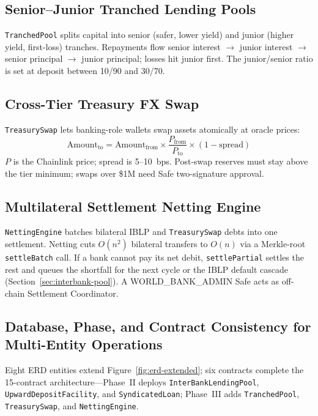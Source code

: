 \documentclass[12pt, a4paper]{report}
\begin{document}
\subsection{Senior--Junior Tranched Lending Pools}
\label{sec:tranched-pools}

\texttt{TranchedPool} splits capital into senior (safer, lower yield) and junior (higher yield, first-loss) tranches. Repayments flow senior interest $\to$ junior interest $\to$ senior principal $\to$ junior principal; losses hit junior first. The junior/senior ratio is set at deposit between 10/90 and 30/70.

\subsection{Cross-Tier Treasury FX Swap}
\label{sec:treasury-fx}

\texttt{TreasurySwap} lets banking-role wallets swap assets atomically at oracle prices:
\begin{equation}
\text{Amount}_{\text{to}} = \text{Amount}_{\text{from}} \times \frac{P_{\text{from}}}{P_{\text{to}}} \times (1 - \text{spread})
\end{equation}
\noindent $P$ is the Chainlink price; spread is 5--10~bps. Post-swap reserves must stay above the tier minimum; swaps over \$1M need Safe two-signature approval.

\subsection{Multilateral Settlement Netting Engine}
\label{sec:netting-settlement}

\texttt{NettingEngine} batches bilateral IBLP and \texttt{TreasurySwap} debts into one settlement. Netting cuts $O(n^2)$ bilateral transfers to $O(n)$ via a Merkle-root \texttt{settleBatch} call. If a bank cannot pay its net debit, \texttt{settlePartial} settles the rest and queues the shortfall for the next cycle or the IBLP default cascade (Section~\ref{sec:interbank-pool}). A WORLD\_BANK\_ADMIN Safe acts as off-chain Settlement Coordinator.

\subsection{Database, Phase, and Contract Consistency for Multi-Entity Operations}
\label{sec:multi-entity-consistency}

Eight ERD entities extend Figure~\ref{fig:erd-extended}; six contracts complete the 15-contract architecture---Phase~II deploys \texttt{InterBankLendingPool}, \texttt{UpwardDepositFacility}, and \texttt{SyndicatedLoan}; Phase~III adds \texttt{TranchedPool}, \texttt{TreasurySwap}, and \texttt{NettingEngine}.
\end{document}

